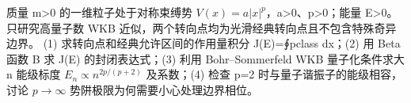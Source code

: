质量 m>0 的一维粒子处于对称束缚势 \(V(x)=a|x|^p\)，a>0、p>0；能量 E>0。只研究高量子数 WKB 近似，两个转向点均为光滑经典转向点且不包含特殊奇异边界。
(1) 求转向点和经典允许区间的作用量积分 J(E)=∮pclass dx；(2) 用 Beta 函数 B 求 J(E) 的封闭表达式；(3) 利用 Bohr–Sommerfeld WKB 量子化条件求大 n 能级标度 \(E_n\propto n^{2p/(p+2)}\) 及系数；(4) 检查 p=2 时与量子谐振子的能级相容，讨论 \(p\to \infty \) 势阱极限为何需要小心处理边界相位。
